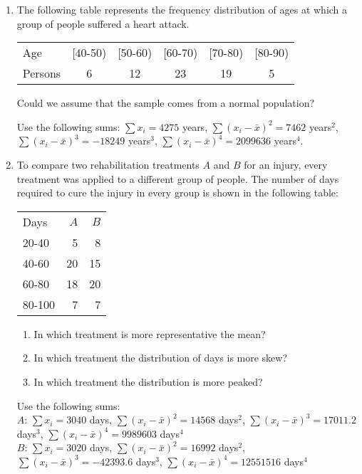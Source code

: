 \begin{enumerate}[leftmargin=*]
\item The following table represents the frequency distribution of ages at which a group of people suffered a heart
attack.
\begin{center}
\begin{tabular}{lccccc}
\toprule
Age & [40-50) & [50-60) & [60-70) & [70-80) & [80-90)  \\
Persons & 6 & 12 & 23 & 19 & 5  \\
\bottomrule
\end{tabular}
\end{center}

Could we assume that the sample comes from a normal population?

Use the following sums: $\sum x_i= 4275$ years, $\sum (x_i-\bar x)^2=7462$ years$^2$, $\sum (x_i-\bar x)^3=-18249$
years$^3$, $\sum (x_i-\bar x)^4=2099636$ years$^4$.

\item To compare two rehabilitation treatments $A$ and $B$ for an injury, every treatment was applied to a different
group of people. The number of days required to cure the injury in every group is shown in the following table:
\begin{center}
\begin{tabular}{lrr}
\toprule
Days & $A$ & $B$ \\
20-40 & 5 & 8 \\
40-60 & 20 & 15 \\
60-80 & 18 & 20 \\
80-100 & 7 & 7 \\
\bottomrule
\end{tabular}
\end{center}

\begin{enumerate}
\item In which treatment is more representative the mean?
\item In which treatment the distribution of days is more skew?
\item In which treatment the distribution is more peaked?
\end{enumerate}

Use the following sums:\\
$A$: $\sum x_i= 3040$ days, $\sum (x_i-\bar x)^2=14568$ days$^2$, $\sum (x_i-\bar x)^3=17011.2$ days$^3$, $\sum
(x_i-\bar x)^4=9989603$ days$^4$\\
$B$: $\sum x_i= 3020$ days, $\sum (x_i-\bar x)^2=16992$ days$^2$, $\sum (x_i-\bar x)^3=-42393.6$ days$^3$, $\sum
(x_i-\bar x)^4=12551516$ days$^4$\\


\end{enumerate}

